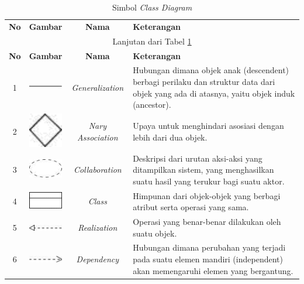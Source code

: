 \begin{enumerate}
\begin{small} %
\begin{longtable}{|c|>{\centering\arraybackslash}m{2cm}|c|p{7cm}|}
    \captionsetup{position=above} %
    \caption{Simbol \textit{Class Diagram}} \label{tab:Class-Diagram} \\ \hline
    \textbf{No} & \textbf{Gambar} & \textbf{Nama} & \textbf{Keterangan} \\ \hline
    \endfirsthead
    \multicolumn{4}{c}{Lanjutan dari Tabel \ref{tab:Class-Diagram}} \\ \hline
    \textbf{No} & \textbf{Gambar} & \textbf{Nama} & \textbf{Keterangan} \\ \hline
    \endhead
    \hline
    \endfoot
    1 & \includegraphics[width=1.5cm, height=1cm]{classDiagram/generalization.jpg} & \textit{Generalization} & Hubungan dimana objek anak (descendent) berbagi perilaku dan struktur data dari objek yang ada di atasnya, yaitu objek induk (ancestor). \\ \hline
    2 & \includegraphics[width=1.5cm]{classDiagram/nary association.png} & \textit{Nary Association} & Upaya untuk menghindari asosiasi dengan lebih dari dua objek. \\ \hline
    3 & \includegraphics[width=1.5cm]{classDiagram/collaboration.png} & \textit{Collaboration} & Deskripsi dari urutan aksi-aksi yang ditampilkan sistem, yang menghasilkan suatu hasil yang terukur bagi suatu aktor. \\ \hline
    4 & \includegraphics[width=1.5cm]{classDiagram/class.png} & \textit{Class} & Himpunan dari objek-objek yang berbagi atribut serta operasi yang sama. \\ \hline
    5 & \includegraphics[width=1.5cm]{classDiagram/realization.jpg} & \textit{Realization} & Operasi yang benar-benar dilakukan oleh suatu objek. \\ \hline
    6 & \includegraphics[width=1.5cm]{classDiagram/dependency.jpg} & \textit{Dependency} & Hubungan dimana perubahan yang terjadi pada suatu elemen mandiri (independent) akan memengaruhi elemen yang bergantung. \\ \hline
\end{longtable}
\end{small}

\end{enumerate}
